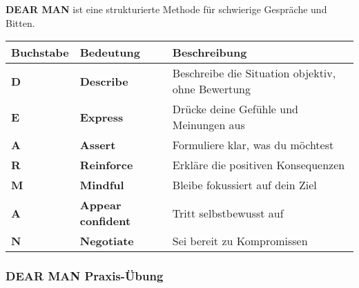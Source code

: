 \begin{ctmmGreenBox}[title=DEAR MAN Technik]

\textbf{DEAR MAN} ist eine strukturierte Methode für schwierige Gespräche und Bitten.

\vspace{0.5em}

\begin{tabular}{|l|l|p{8cm}|}
\hline
\textbf{Buchstabe} & \textbf{Bedeutung} & \textbf{Beschreibung} \\
\hline
\textcolor{ctmmBlue}{\textbf{D}} & \textbf{Describe} & Beschreibe die Situation objektiv, ohne Bewertung \\
\hline
\textcolor{ctmmGreen}{\textbf{E}} & \textbf{Express} & Drücke deine Gefühle und Meinungen aus \\
\hline
\textcolor{ctmmOrange}{\textbf{A}} & \textbf{Assert} & Formuliere klar, was du möchtest \\
\hline
\textcolor{ctmmPurple}{\textbf{R}} & \textbf{Reinforce} & Erkläre die positiven Konsequenzen \\
\hline
\textcolor{ctmmRed}{\textbf{M}} & \textbf{Mindful} & Bleibe fokussiert auf dein Ziel \\
\hline
\textcolor{ctmmBlue}{\textbf{A}} & \textbf{Appear confident} & Tritt selbstbewusst auf \\
\hline
\textcolor{ctmmGreen}{\textbf{N}} & \textbf{Negotiate} & Sei bereit zu Kompromissen \\
\hline
\end{tabular}

\end{ctmmGreenBox}

\subsubsection{DEAR MAN Praxis-Übung}

